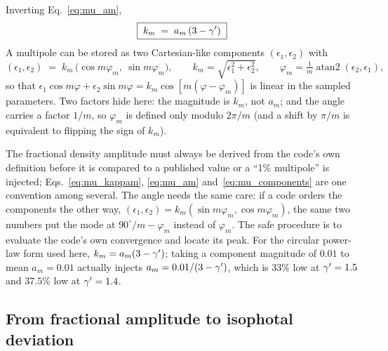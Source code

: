 Inverting Eq.~\eqref{eq:mu_am},
\begin{equation}
    \boxed{\; k_m \;=\; a_m\,(3-\gamma') \;}
    \label{eq:mu_km_am}
\end{equation}
A multipole can be stored as two Cartesian-like
components $(\epsilon_1,\epsilon_2)$ with
\begin{equation}
    (\epsilon_1,\epsilon_2) \;=\; k_m\,\big(\cos m\varphi_m,\ \sin m\varphi_m\big),
    \qquad
    k_m = \sqrt{\epsilon_1^2+\epsilon_2^2},
    \qquad
    \varphi_m = \tfrac1m\operatorname{atan2}(\epsilon_2,\epsilon_1),
    \label{eq:mu_components}
\end{equation}
so that $\epsilon_1\cos m\varphi + \epsilon_2\sin m\varphi =
k_m\cos[m(\varphi-\varphi_m)]$ is linear in the sampled parameters.
Two factors hide here: the magnitude is $k_m$, not $a_m$; and the
angle carries a factor $1/m$, so $\varphi_m$ is defined only modulo
$2\pi/m$ (and a shift by $\pi/m$ is equivalent to flipping the sign of
$k_m$).

\begin{keybox}
The fractional density amplitude must always be derived from the
code's own definition before it is compared to a published value or a
``1\% multipole'' is injected; Eqs.~\eqref{eq:mu_kappam},
\eqref{eq:mu_am} and~\eqref{eq:mu_components} are one convention among
several.  The angle needs the same care: if a code orders the
components the other way, $(\epsilon_1,\epsilon_2)=k_m(\sin m\varphi_m,\cos
m\varphi_m)$, the same two numbers put the mode at $90^\circ/m -
\varphi_m$ instead of $\varphi_m$.  The safe procedure is to evaluate
the code's own convergence and locate its peak.  For the circular
power-law form used here, $k_m = a_m(3-\gamma')$; taking a component
magnitude of $0.01$ to mean $a_m=0.01$ actually injects
$a_m = 0.01/(3-\gamma')$, which is $33\%$ low at $\gamma'=1.5$ and $37.5\%$ low
at $\gamma'=1.4$.
\end{keybox}

\subsection{From fractional amplitude to isophotal deviation}
\label{sec:mu_isophote}

